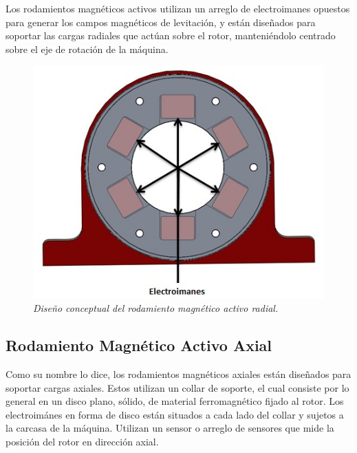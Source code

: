 Los rodamientos magnéticos activos utilizan un arreglo de electroimanes opuestos para generar los campos magnéticos de levitación, y están diseñados para soportar las cargas radiales que actúan sobre el rotor, manteniéndolo centrado sobre el eje de rotación de la máquina.

\begin{figure}[htb]
\centering
	\includegraphics[scale=.65]{images/Capitulo_2/RMAR}
	\caption{\textit{Diseño conceptual del rodamiento magnético activo radial.}}
	\label{fig:system:example1}
\end{figure}

\subsection{Rodamiento Magnético Activo Axial}

Como su nombre lo dice, los rodamientos magnéticos axiales están diseñados para soportar cargas axiales. Estos utilizan un collar de soporte, el cual consiste por lo general en un disco plano, sólido, de material ferromagnético fijado al rotor. Los electroimánes en forma de disco están situados a cada lado del collar y sujetos a la carcasa de la máquina. Utilizan un sensor o arreglo de sensores que mide la posición del rotor en dirección axial. 

